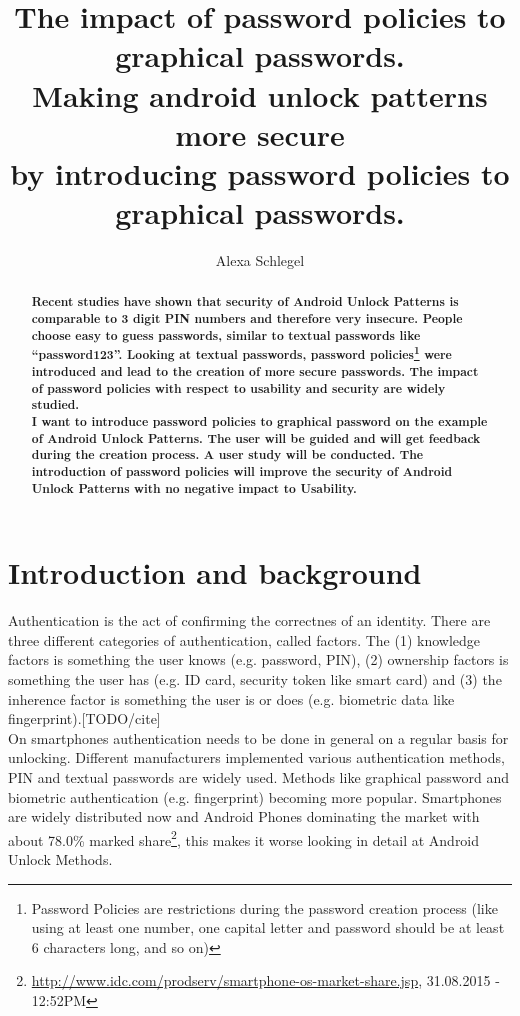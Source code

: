 \documentclass[twocolumn, a4paper, 10pt]{article}
\begin{document}
\title{
  The impact of password policies to graphical passwords.\\
  \large Making android unlock patterns more secure \\
  by introducing password policies to graphical passwords.}

\author{
	Alexa Schlegel
}

\maketitle


\def\abstractname{{\textbf Abstract}}
\begin{abstract}
{
\bfseries
Recent studies have shown that security of Android Unlock Patterns is comparable to 3 digit PIN numbers and therefore very insecure. People choose easy to guess passwords, similar to textual passwords like ``password123''. Looking at textual passwords, password policies\footnote{Password Policies are restrictions during the password creation process (like using at least one number, one capital letter and password should be at least 6 characters long, and so on)} were introduced and lead to the creation of more secure passwords. The impact of password policies with respect to usability and security are widely studied.\\

I want to introduce password policies to graphical password on the example of Android Unlock Patterns. The user will be guided and will get feedback during the creation process. A user study will be conducted. The introduction of password policies will improve the security of Android Unlock Patterns with no negative impact to Usability.
}
\end{abstract}


\section{Introduction and background}
Authentication is the act of confirming the correctnes of an identity. There are three different categories of authentication, called factors. The (1) knowledge factors is something the user knows (e.g. password, PIN), (2) ownership factors is something the user has (e.g. ID card, security token like smart card) and (3) the inherence factor is something the user is or does (e.g. biometric data like fingerprint).[TODO/cite]\\

On smartphones authentication needs to be done in general on a regular basis for unlocking. Different manufacturers implemented various authentication methods, PIN and textual passwords are widely used. Methods like graphical password and biometric authentication (e.g. fingerprint) becoming more popular. Smartphones are widely distributed now and Android Phones dominating the market with about 78.0\% marked share\footnote{\url{http://www.idc.com/prodserv/smartphone-os-market-share.jsp}, 31.08.2015 - 12:52PM}, this makes it worse looking in detail at Android Unlock Methods.\\
\end{document}
